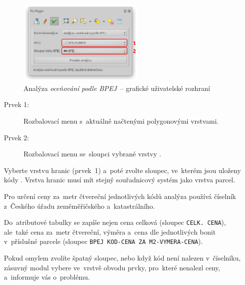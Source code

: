 	\begin{figure}[H]
		\centering
		\includegraphics[width=0.55\textwidth]{./pictures/analyza_bpej.png}
		\caption[Analýza \textit{oceňování podle BPEJ}~– grafické uživatelské rozhraní]{Analýza \textit{oceňování podle BPEJ}~– grafické uživatelské rozhraní}
		\label{fig:manual_analyza_bpej_gui}
 	\end{figure}

\begin{description}
	\item[Prvek 1:] Rozbalovací menu s~aktuálně načtenými polygonovými vrstvami.
	\item[Prvek 2:] Rozbalovací menu se~sloupci vybrané vrstvy .
\end{description}

Vyberte vrstvu hranic  (prvek~1) a~poté zvolte sloupec, ve~kterém jsou uloženy kódy . Vrstva hranic  musí mít stejný souřadnicový systém jako vrstva parcel.

Pro určení ceny za~metr čtvereční jednotlivých kódů  analýza používá číselník  z~Českého úřadu zeměměřičského a~katastrálního.

Do~atributové tabulky se zapíše nejen cena celková (sloupec \texttt{CELK. CENA}), ale~také cena za~metr čtvereční, výměra a~cena dle jednotlivých bonit v~příslušné parcele (sloupec \texttt{BPEJ KOD-CENA ZA M2-VYMERA-CENA}).

Pokud omylem zvolíte špatný slou\-pec, nebo když kód  není nalezen v~číselníku, zásuvný modul vybere ve~vrstvě obvodu prvky, pro~které nenalezl ceny, a~informuje vás o~problému.
